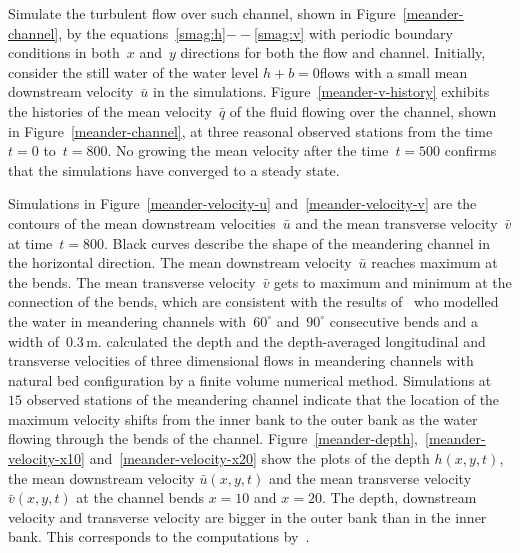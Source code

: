 \documentclass[12pt,a5paper]{article}
\newcommand{\uu}{{\bar u}}
\newcommand{\vv}{{\bar v}}
\newcommand{\bq}{{\bar q}}
\begin{document}
Simulate the turbulent flow over such channel, shown in Figure~\ref{meander-channel}, by the equations~\eqref{smag:h}$--$\eqref{smag:v} with periodic boundary conditions in both~$x$ and~$y$ directions for both the flow and channel. Initially, consider the still water of the water level $h+b=0$flows with a small mean downstream velocity~$\uu$ in the simulations. 
Figure~\ref{meander-v-history} exhibits the histories of the mean velocity~$\bq$ of the fluid flowing over the channel, shown in Figure~\ref{meander-channel}, at three reasonal observed stations from the time~$t=0$ to~$t=800$. 
No growing the mean velocity after the time~$t=500$ confirms that the simulations have converged to a steady state.

Simulations in Figure~\ref{meander-velocity-u} and~\ref{meander-velocity-v} are the contours of the mean downstream velocities~$\uu$ and the mean transverse velocity~$\vv$ at time~$t=800$. 
Black curves describe the shape of the meandering channel in the horizontal direction. 
The mean downstream velocity~$\uu$ reaches maximum at the bends.
The mean transverse velocity~$\vv$ gets to maximum and minimum at the connection of the bends, which are consistent with the results of~\cite{Liu2009} who modelled the water in meandering channels with~$60^\circ$ and~$90^\circ$ consecutive bends and a width of~$0.3$\,m.
\cite{Demuren1993} calculated the depth and the depth-averaged longitudinal and transverse velocities of three dimensional flows in meandering channels with natural bed configuration by a finite volume numerical method. 
Simulations at~$15$ observed stations of the meandering channel indicate that the location of the maximum velocity shifts from the inner bank to the outer bank as the water flowing through the bends of the channel. 
Figure~\ref{meander-depth},~\ref{meander-velocity-x10} and~\ref{meander-velocity-x20} show the plots of the depth $h(x,y,t)$, the mean downstream velocity $\uu(x,y,t)$ and the mean transverse velocity $\vv(x,y,t)$ at the channel bends $x=10$ and $x=20$.
The depth, downstream velocity and transverse velocity are bigger in the outer bank than in the inner bank.
This corresponds to the computations by~\cite{Demuren1993}. 
\end{document}
